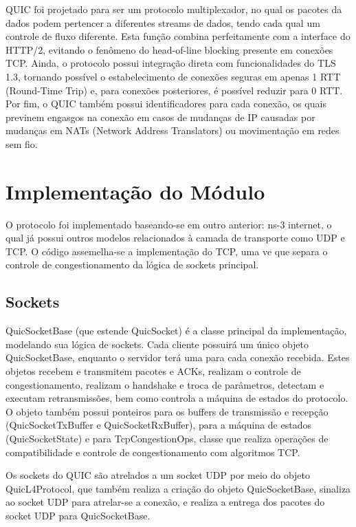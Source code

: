 \documentclass{article}
\begin{document}
QUIC foi projetado para ser um protocolo multiplexador, no qual os pacotes da dados podem pertencer a diferentes streams
de dados, tendo cada qual um controle de fluxo diferente. Esta função combina perfeitamente com a interface do HTTP/2,
evitando o fenômeno do head-of-line blocking presente em conexões TCP. Ainda, o protocolo possui integração direta com
funcionalidades do TLS 1.3, tornando possível o estabelecimento de conexões seguras em apenas 1 RTT (Round-Time Trip) e,
para conexões posteriores, é possível reduzir para 0 RTT. Por fim, o QUIC também possui identificadores para cada
conexão, os quais previnem engasgos na conexão em casos de mudanças de IP causadas por mudanças em NATs (Network Address
Translators) ou movimentação em redes sem fio.

\section{Implementação do Módulo}
O protocolo foi implementado baseando-se em outro anterior: ns-3 internet, o qual já possui outros modelos relacionados
à camada de transporte como UDP e TCP. O código assemelha-se a implementação do TCP, uma ve que separa o controle de
congestionamento da lógica de sockets principal.

\subsection{Sockets}

QuicSocketBase (que estende QuicSocket) é a classe principal da implementação, modelando sua lógica de sockets. Cada
cliente possuirá um único objeto QuicSocketBase, enquanto o servidor terá uma para cada conexão recebida. Estes objetos
recebem e transmitem pacotes e ACKs, realizam o controle de congestionamento, realizam o handshake e troca de
parâmetros, detectam e executam retransmissões, bem como controla a máquina de estados do protocolo. O objeto também
possui ponteiros para os buffers de transmissão e recepção (QuicSocketTxBuffer e QuicSocketRxBuffer), para a máquina de
estados (QuicSocketState) e para TcpCongestionOps, classe que realiza operações de compatibilidade e controle de
congestionamento com algoritmos TCP.

Os sockets do QUIC são atrelados a um socket UDP por meio do objeto QuicL4Protocol, que também realiza a criação do
objeto QuicSocketBase, sinaliza ao socket UDP para atrelar-se a conexão, e realiza a entrega dos pacotes do socket UDP
para QuicSocketBase. 
\end{document}
